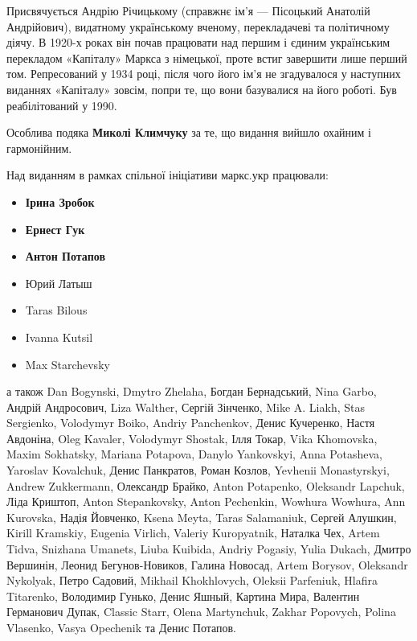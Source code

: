 
Присвячується Андрію Річицькому (справжнє ім'я — Пісоцький Анатолій Андрійович), видатному українському вченому, перекладачеві та політичному діячу. В 1920-х роках він почав працювати над першим і єдиним українським перекладом «Капіталу» Маркса з німецької, проте встиг завершити лише перший том. Репресований у 1934 році, після чого його ім’я не згадувалося у наступних виданнях «Капіталу» зовсім, попри те, що вони базувалися на його роботі. Був реабілітований у 1990. 


\noindent{}Особлива подяка \textbf{Миколі Климчуку} за те,
що видання вийшло охайним і гармонійним. 

\smallskip
\noindent{}Над виданням в рамках спільної ініціативи маркс.укр працювали:
\begin{itemize}[nosep]
\item \textbf{Ірина Зробок}
\item \textbf{Ернест Гук}
\item \textbf{Антон Потапов}
\item Юрий Латыш
\item Taras Bilous
\item Ivanna Kutsil
\item Max Starchevsky
\end{itemize}
\noindent{}а також
Dan Bogynski, 
Dmytro Zhelaha,
Богдан Бернадський,
Nina Garbo, Андрій Андросович, Liza Walther, Сергій Зінченко,
Mike A. Liakh, Stas Sergienko, Volodymyr Boiko, Andriy Panchenkov, Денис Кучеренко, Настя Авдоніна, Oleg Kavaler, Volodymyr Shostak, Ілля Токар, Vika Khomovska, Maxim Sokhatsky, Mariana Potapova, Danylo Yankovskyi, Anna Potasheva, Yaroslav Kovalchuk, Денис Панкратов, Роман Козлов, \textenglish{Yevhenii Mo\-nas\-tyr\-skyi}, Andrew Zukkermann, Олександр Брайко, Anton Potapenko, Oleksandr Lapchuk, Ліда Криштоп, Anton Stepankovsky, Anton Pechenkin, Wowhura Wowhura, Ann Kurovska, Надія Йовченко, \textenglish{Ksena Meyta, Taras Salamaniuk}, Сергей Алушкин, \textenglish{Kirill Kramskiy}, Eugenia Virlich, Valeriy Kuropyatnik, Наталка Чех, Artem Tidva, Snizhana Umanets, Liuba Kuibida, Andriy Pogasiy, Yulia Dukach, Дмитро Вершинін, Леонид Бегунов-Новиков, Галина Новосад, Artem Borysov, Oleksandr Nykolyak, Петро Садовий, Mikhail Khokhlovych, Oleksii Parfeniuk, Hlafira Titarenko, Володимир Гунько, Денис Яшный, Картина Мира, Валентин Германович Дупак, Classic Starr, Olena Martynchuk, Zakhar Popovych, Polina Vlasenko, Vasya Opechenik та Денис Потапов.



\cleardoublepage